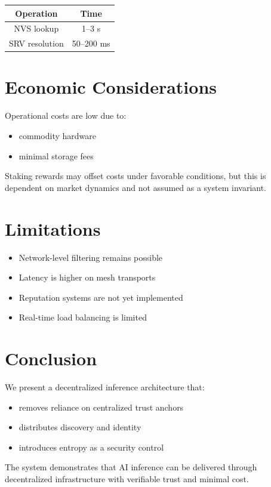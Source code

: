 \documentclass[11pt]{article}
\begin{document}
\begin{tabular}{|c|c|}
\hline
Operation & Time \\
\hline
NVS lookup & 1--3 s \\
SRV resolution & 50--200 ms \\
\hline
\end{tabular}

\section{Economic Considerations}

Operational costs are low due to:
\begin{itemize}
    \item commodity hardware
    \item minimal storage fees
\end{itemize}

Staking rewards may offset costs under favorable conditions, but this is dependent on market dynamics and not assumed as a system invariant.

\section{Limitations}

\begin{itemize}
    \item Network-level filtering remains possible
    \item Latency is higher on mesh transports
    \item Reputation systems are not yet implemented
    \item Real-time load balancing is limited
\end{itemize}

\section{Conclusion}

We present a decentralized inference architecture that:
\begin{itemize}
    \item removes reliance on centralized trust anchors
    \item distributes discovery and identity
    \item introduces entropy as a security control
\end{itemize}

The system demonstrates that AI inference can be delivered through decentralized infrastructure with verifiable trust and minimal cost.
\end{document}
